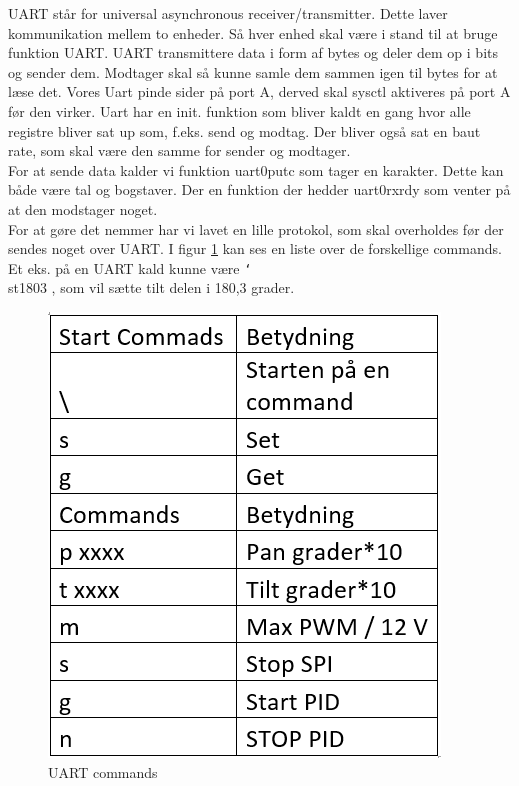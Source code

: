 UART står for universal asynchronous receiver/transmitter. Dette laver kommunikation mellem to enheder. Så hver enhed skal være i stand til at bruge funktion UART. UART transmittere data i form af bytes og deler dem op i bits og sender dem. Modtager skal så kunne samle dem sammen igen til bytes for at læse det.
Vores Uart pinde sider på port A, derved skal sysctl aktiveres på port A før den virker. Uart har en init. funktion som bliver kaldt en gang hvor alle registre bliver sat up som, f.eks. send og modtag. Der bliver også sat en baut rate, som skal være den samme for sender og modtager.
\\
For at sende data kalder vi funktion uart0\textunderscore putc som tager en karakter. Dette kan både være tal og bogstaver. Der en funktion der hedder uart0\textunderscore rx\textunderscore rdy som venter på at den modstager noget.
\\
For at gøre det nemmer har vi lavet en lille protokol, som skal overholdes før der sendes noget over UART. I figur \ref{fig:UARTCMD} kan ses en liste over de forskellige commands. Et eks. på en UART kald kunne være \texttt{\char`\\}st1803 , som vil sætte tilt delen i 180,3 grader.

\begin{figure}[ht]
			\begin{center}
			\includegraphics[scale=0.5]{Billeder/UARTCMD.png}
			\end{center}
			\caption{UART commands}
			\label{fig:UARTCMD}
\end{figure}

